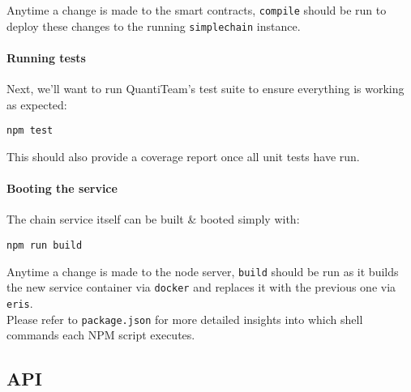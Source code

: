 Anytime a change is made to the smart contracts, \texttt{compile} should
be run to deploy these changes to the running \texttt{simplechain}
instance.

\paragraph{Running tests}\label{running-tests}

Next, we'll want to run QuantiTeam's test suite to ensure everything is
working as expected:

\begin{verbatim}
npm test
\end{verbatim}

This should also provide a coverage report once all unit tests have run.

\paragraph{Booting the service}\label{booting-the-service}

The chain service itself can be built \& booted simply with:

\begin{verbatim}
npm run build
\end{verbatim}

Anytime a change is made to the node server, \texttt{build} should be
run as it builds the new service container via \texttt{docker} and
replaces it with the previous one via \texttt{eris}.\\
Please refer to \texttt{package.json} for more detailed insights into
which shell commands each NPM script executes.

\subsection{API}\label{api}

